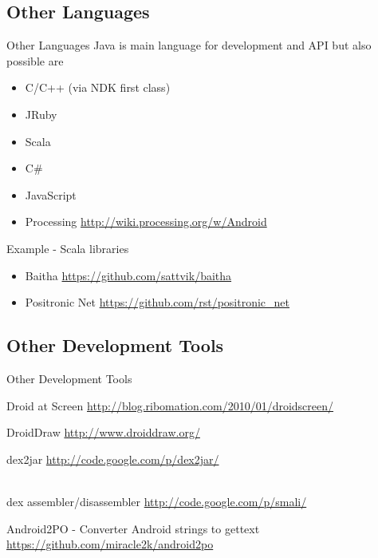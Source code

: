 \documentclass[aspectratio=169]{beamer}
\newcommand{\surl}[1] {{\tiny \url{#1}}}
\begin{document}
  \subsection{Other Languages}
    \begin{frame}{Other Languages}
      Java is main language for development and API but also possible are 
      \begin{itemize}
      \item C/C++ (via NDK first class)
      \item JRuby
      \item Scala
      \item C\#
      \item JavaScript
      \item Processing \surl{http://wiki.processing.org/w/Android}
      \end{itemize}
    \end{frame}

    \begin{frame}{Example - Scala libraries}
      \begin{itemize}
       \item Baitha \surl{https://github.com/sattvik/baitha}
       \item Positronic Net \surl{https://github.com/rst/positronic_net}
      \end{itemize}

    \end{frame}



  \subsection{Other Development Tools}

    \begin{frame}{Other Development Tools}
      \begin{description}
      
        \item<1->Droid at Screen \surl{http://blog.ribomation.com/2010/01/droidscreen/}
        \item DroidDraw \surl{http://www.droiddraw.org/} 
        \item<2->dex2jar \surl{http://code.google.com/p/dex2jar/}
        \item[smali/baksmali] \hfill \\ dex assembler/disassembler \surl{http://code.google.com/p/smali/}
        \item<3->Android2PO - Converter Android strings to gettext \surl{https://github.com/miracle2k/android2po}
      \end{description}
   \end{frame}
\end{document}
